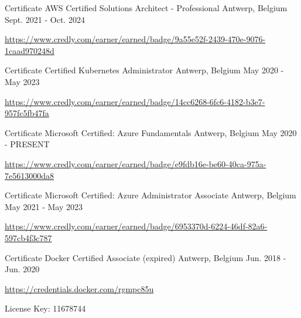 \begin{cventries}
  \cventry
    {Certificate} %
    {AWS Certified Solutions Architect - Professional} %
    {Antwerp, Belgium} %
    {Sept. 2021 - Oct. 2024} %
    {
      \begin{cvitems} %
        \item \url{https://www.credly.com/earner/earned/badge/9a55e52f-2439-470e-9076-1caad970248d}
      \end{cvitems}
    }

  \cventry
    {Certificate} %
    {Certified Kubernetes Administrator} %
    {Antwerp, Belgium} %
    {May 2020 - May 2023} %
    {
      \begin{cvitems} %
        \item \url{https://www.credly.com/earner/earned/badge/14cc6268-6fc6-4182-b3e7-957fc5fb47fa}
      \end{cvitems}
    }

  \cventry
    {Certificate} %
    {Microsoft Certified: Azure Fundamentals} %
    {Antwerp, Belgium} %
    {May 2020 - PRESENT} %
    {
      \begin{cvitems} %
        \item \url{https://www.credly.com/earner/earned/badge/e9fdb16e-be60-40ca-975a-7e5613000da8}
      \end{cvitems}
    }

  \cventry
    {Certificate} %
    {Microsoft Certified: Azure Administrator Associate} %
    {Antwerp, Belgium} %
    {May 2021 - May 2023} %
    {
      \begin{cvitems} %
        \item \url{https://www.credly.com/earner/earned/badge/6953370d-6224-46df-82a6-597cb4f3c787}
      \end{cvitems}
    }

  \cventry
    {Certificate} %
    {Docker Certified Associate (expired)} %
    {Antwerp, Belgium} %
    {Jun. 2018 - Jun. 2020} %
    {
      \begin{cvitems} %
        \item \url{https://credentials.docker.com/rgmpc85u}
        \item {License Key: 11678744}
      \end{cvitems}
    }

\end{cventries}
